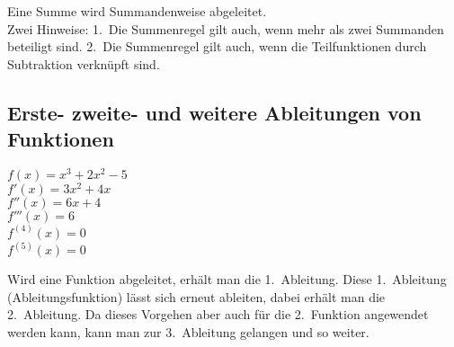 Eine Summe wird Summandenweise abgeleitet.\\
Zwei Hinweise: 1.~Die Summenregel gilt auch, wenn mehr als zwei Summanden beteiligt sind.
2.~Die Summenregel gilt auch, wenn die Teilfunktionen durch Subtraktion verknüpft sind.

\subsection{Erste- zweite- und weitere Ableitungen von Funktionen}
\begin{multicols}{3}
$f(x) = x^3 + 2x^2 - 5$\\
$f'(x) = 3x^2 + 4x$\\
$f''(x) = 6x + 4$\\
$f'''(x) = 6$\\
$f^{(4)}(x) = 0$\\
$f^{(5)}(x) = 0$
\end{multicols}

Wird eine Funktion abgeleitet, erhält man die 1.~Ableitung.
Diese 1.~Ableitung (Ableitungsfunktion) lässt sich erneut ableiten, dabei erhält man die 2.~Ableitung.
Da dieses Vorgehen aber auch für die 2.~Funktion angewendet werden kann, kann man zur 3.~Ableitung gelangen
und so weiter.

